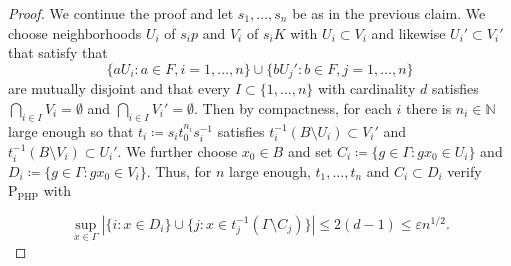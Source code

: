 \documentclass[12pt,nosumlimits,nonamelimits]{amsart}
\theoremstyle{remark}
\theoremstyle{definition}
\newcommand{\IN}{\mathbb{N}}
\newcommand{\ve}{\varepsilon}
\newcommand{\Ga}{\Gamma}
\begin{document}
\begin{proof}
We continue the proof and let $s_1,\ldots,s_n$ 
be as in the previous claim. 
We choose neighborhoods 
$U_i$ of $s_ip$ and $V_i$ of $s_iK$ with $U_i\subset V_i$
and likewise $U_i'\subset V_i'$ that satisfy that 
\[
\{ a U_i : a \in F, i=1,\ldots,n \}\cup \{ b U_j' : b \in F, j=1,\ldots,n \}
\]
are mutually disjoint and that 
every $I\subset\{1,\ldots,n\}$ 
with cardinality $d$ satisfies 
$\bigcap_{i\in I} V_i = \emptyset$ and $\bigcap_{i\in I} V_i' = \emptyset$.
%
% 
Then by compactness, for each $i$ 
there is $n_i\in\IN$ large enough so that 
$t_i\coloneq s_it_0^{n_i}s_i^{-1}$ satisfies 
$t_i^{-1}(B\setminus U_i)\subset V_i'$ and 
$t_i^{-1}(B\setminus V_i)\subset U_i'$. 
We further choose $x_0\in B$ and 
set $C_i\coloneq\{ g \in \Ga : gx_0 \in U_i \}$ 
and $D_i\coloneq\{ g\in\Ga : gx_0\in V_i\}$. 
Thus, for $n$ large enough, 
$t_1,\ldots,t_n$ and $C_i\subset D_i$ verify
$\mathrm{P}_{\mathrm{PHP}}$ with 

\begin{minipage}{.95\textwidth}
\[
\sup_{x\in\Ga} |\{ i : x\in D_i \} \cup \{ j : x \in t_j^{-1} (\Ga\setminus C_j)\}| \le 2(d-1) \le \ve n^{1/2}.
\]\end{minipage}
\end{proof}
%
%
\end{document}
